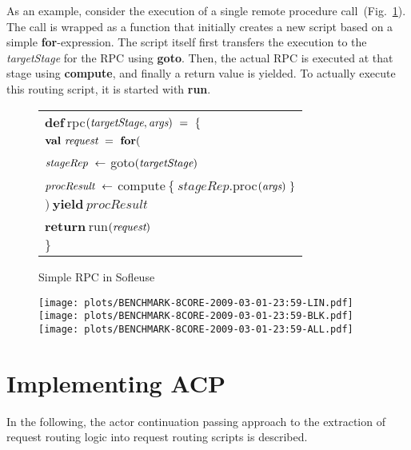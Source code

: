\documentclass{sig-alternate}
\begin{document}
As an example, consider the execution of a single remote procedure call~(Fig.~\ref{fig:rpc}). The
call is wrapped as a function that initially creates a new script based on a simple
\textbf{for}-expression. The script itself first transfers the execution to the \emph{targetStage}
for the RPC using \textbf{goto}. Then, the actual RPC is executed at that stage using
\textbf{compute}, and finally a return value is yielded. To actually execute this routing script, it
is started with \textbf{run}.

\begin{figure}
\centering    
{\footnotesize\begin{tabular}{l}           
$\textbf{def}\ $rpc$(\emph{targetStage}, \emph{args})\ =\ \{$\\	
\hspace{2ex} $\textbf{val}\ \emph{request}\ =\ \textbf{for} ($\\
\hspace{6ex} $\emph{stageRep}\ \leftarrow\ $goto$(\emph{targetStage})$\\
\hspace{6ex} $\emph{procResult}\ \leftarrow\ $compute$\ \{\ stageRep.$proc$(\emph{args})\ \}$\\
\hspace{2ex} $)\ \textbf{yield}\ procResult$\\
\hspace{2ex} $\textbf{return}\ $run$(\emph{request})$\\   
$\}$\\
\end{tabular}}
\caption{Simple RPC in Sofleuse\label{fig:rpc}}
\end{figure}

\begin{figure*}[t]
\begin{center}
\texttt{[image: plots/BENCHMARK-8CORE-2009-03-01-23:59-LIN.pdf]}%
\texttt{[image: plots/BENCHMARK-8CORE-2009-03-01-23:59-BLK.pdf]}%
\texttt{[image: plots/BENCHMARK-8CORE-2009-03-01-23:59-ALL.pdf]}
\end{center}
\end{figure*}
	

\section{Implementing ACP}

In the following, the actor continuation passing approach to the extraction of request routing logic
into request routing scripts is described.
                             
\end{document}
